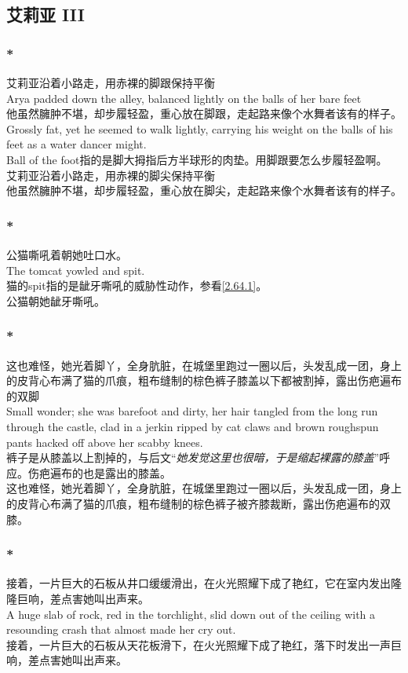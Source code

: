\documentclass[12pt,a4paper]{article}
\newcommand{\h}[1]{{\color{red}#1}\\}
\newcommand{\la}[1]{{\color{blue}#1}\\}
\begin{document}
\subsection{艾莉亚 III}\label{1.32}
\subsubsection{\color{red}*}\la{
 艾莉亚沿着小路走，用赤裸的脚跟保持平衡\\
 Arya padded down the alley, balanced lightly on the balls of her bare feet\\
 他虽然臃肿不堪，却步履轻盈，重心放在脚跟，走起路来像个水舞者该有的样子。\\
 Grossly fat, yet he seemed to walk lightly, carrying his weight on the balls of his feet as a water dancer might.}\h{
Ball of the foot指的是脚大拇指后方半球形的肉垫。用脚跟要怎么步履轻盈啊。}
 艾莉亚沿着小路走，用赤裸的脚尖保持平衡\\
 他虽然臃肿不堪，却步履轻盈，重心放在脚尖，走起路来像个水舞者该有的样子。
\subsubsection{\color{red}*}\label{1.32.2}\la{
	公猫嘶吼着朝她吐口水。\\
	The tomcat yowled and spit.}\h{
	猫的spit指的是龇牙嘶吼的威胁性动作，参看\ref{2.64.1}。}
	公猫朝她龇牙嘶吼。
	
\subsubsection{\color{red}*}\la{
	这也难怪，她光着脚丫，全身肮脏，在城堡里跑过一圈以后，头发乱成一团，身上的皮背心布满了猫的爪痕，粗布缝制的棕色裤子膝盖以下都被割掉，露出伤疤遍布的双脚\\
	Small wonder; she was barefoot and dirty, her hair tangled from the long run through the castle, clad in a jerkin ripped by cat claws and brown roughspun pants hacked off above her scabby knees.}\h{
	裤子是从膝盖以上割掉的，与后文“\emph{她发觉这里也很暗，于是缩起裸露的膝盖}”呼应。伤疤遍布的也是露出的膝盖。}
	这也难怪，她光着脚丫，全身肮脏，在城堡里跑过一圈以后，头发乱成一团，身上的皮背心布满了猫的爪痕，粗布缝制的棕色裤子被齐膝裁断，露出伤疤遍布的双膝。
\subsubsection{\color{red}*}\la{	
	接着，一片巨大的石板从井口缓缓滑出，在火光照耀下成了艳红，它在室内发出隆隆巨响，差点害她叫出声来。\\
	A huge slab of rock, red in the torchlight, slid down out of the ceiling with a resounding crash that almost made her cry out.}
	接着，一片巨大的石板从天花板滑下，在火光照耀下成了艳红，落下时发出一声巨响，差点害她叫出声来。
	
\end{document}
